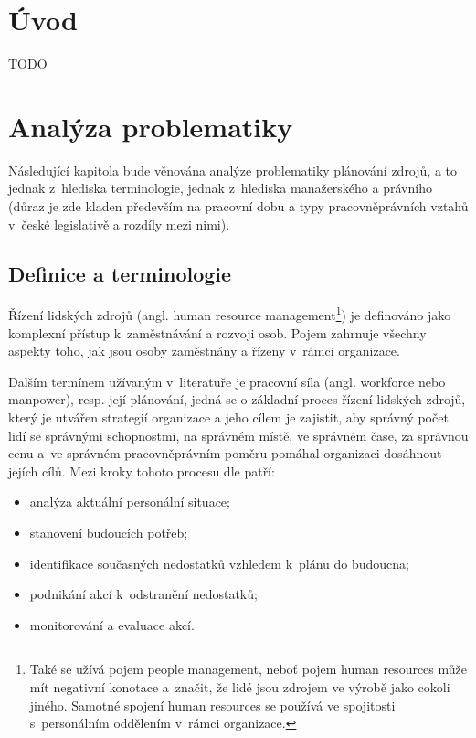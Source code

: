 \documentclass[twoside]{ctuthesis}
\begin{document}
\maketitle

\chapter{Úvod}
TODO


\chapter{Analýza problematiky}
Následující kapitola bude věnována analýze problematiky plánování zdrojů, a to jednak z~hlediska terminologie, jednak z~hlediska manažerského a právního (důraz je zde kladen především na pracovní dobu a typy pracovněprávních vztahů v~české legislativě a rozdíly mezi nimi).

\section{Definice a terminologie}

Řízení lidských zdrojů (angl. human resource management\footnote{Také se užívá pojem people management, neboť pojem human resources může mít negativní konotace a~značit, že lidé jsou zdrojem ve výrobě jako cokoli jiného. \cite[s.~1]{armstrong2014} Samotné spojení human resources se používá ve spojitosti s~personálním oddělením v~rámci organizace. }) je definováno jako komplexní přístup k~zaměstnávání a rozvoji osob. Pojem zahrnuje všechny aspekty toho, jak jsou osoby zaměstnány a řízeny v~rámci organizace. \cite[s.~1]{armstrong2014}

Dalším termínem užívaným v~literatuře je pracovní síla (angl. workforce nebo manpower), resp. její plánování, jedná se o základní proces řízení lidských zdrojů, který je utvářen strategií organizace a jeho cílem je zajistit, aby správný počet lidí se správnými schopnostmi, na správném místě, ve správném čase, za správnou cenu a~ve správném pracovněprávním poměru pomáhal organizaci dosáhnout jejích cílů. \cite{cipd2020_workforce} Mezi kroky tohoto procesu dle \cite{cipd2020_workforce} patří:
\begin{itemize}
	\item analýza aktuální personální situace;
	\item stanovení budoucích potřeb;
	\item identifikace současných nedostatků vzhledem k~plánu do budoucna;
	\item podnikání akcí k~odstranění nedostatků;
	\item monitorování a evaluace akcí.
\end{itemize}
\end{document}
